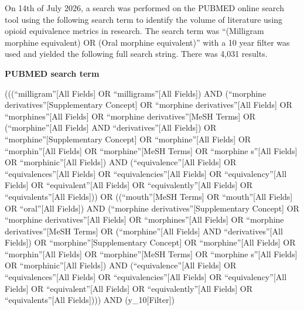 \documentclass[
  letterpaper,
  DIV=11,
  numbers=noendperiod]{scrreprt}
\begin{document}
{On 14th of July 2026, a search was performed on the PUBMED online search
tool using the following search term to identify the volume of
literature using opioid equivalence metrics in research. The search term
was ``(Milligram morphine equivalent) OR (Oral morphine equivalent)''
with a 10 year filter was used and yielded the following full search
string. There was 4,031 results.

\begin{tcolorbox}[enhanced jigsaw, rightrule=.15mm, toprule=.15mm, opacityback=0, breakable, bottomrule=.15mm, colback=white, leftrule=.75mm, arc=.35mm, left=2mm, colframe=quarto-callout-note-color-frame]
\begin{minipage}[t]{5.5mm}
\textcolor{quarto-callout-note-color}{\faInfo}
\end{minipage}%
\begin{minipage}[t]{\textwidth - 5.5mm}

\vspace{-3mm}\textbf{PUBMED search term}\vspace{3mm}

(((``milligram''{[}All Fields{]} OR ``milligrams''{[}All Fields{]}) AND
(``morphine derivatives''{[}Supplementary Concept{]} OR ``morphine
derivatives''{[}All Fields{]} OR ``morphines''{[}All Fields{]} OR
``morphine derivatives''{[}MeSH Terms{]} OR (``morphine''{[}All
Fields{]} AND ``derivatives''{[}All Fields{]}) OR
``morphine''{[}Supplementary Concept{]} OR ``morphine''{[}All Fields{]}
OR ``morphin''{[}All Fields{]} OR ``morphine''{[}MeSH Terms{]} OR
``morphine s''{[}All Fields{]} OR ``morphinic''{[}All Fields{]}) AND
(``equivalence''{[}All Fields{]} OR ``equivalences''{[}All Fields{]} OR
``equivalencies''{[}All Fields{]} OR ``equivalency''{[}All Fields{]} OR
``equivalent''{[}All Fields{]} OR ``equivalently''{[}All Fields{]} OR
``equivalents''{[}All Fields{]})) OR ((``mouth''{[}MeSH Terms{]} OR
``mouth''{[}All Fields{]} OR ``oral''{[}All Fields{]}) AND (``morphine
derivatives''{[}Supplementary Concept{]} OR ``morphine
derivatives''{[}All Fields{]} OR ``morphines''{[}All Fields{]} OR
``morphine derivatives''{[}MeSH Terms{]} OR (``morphine''{[}All
Fields{]} AND ``derivatives''{[}All Fields{]}) OR
``morphine''{[}Supplementary Concept{]} OR ``morphine''{[}All Fields{]}
OR ``morphin''{[}All Fields{]} OR ``morphine''{[}MeSH Terms{]} OR
``morphine s''{[}All Fields{]} OR ``morphinic''{[}All Fields{]}) AND
(``equivalence''{[}All Fields{]} OR ``equivalences''{[}All Fields{]} OR
``equivalencies''{[}All Fields{]} OR ``equivalency''{[}All Fields{]} OR
``equivalent''{[}All Fields{]} OR ``equivalently''{[}All Fields{]} OR
``equivalents''{[}All Fields{]}))) AND (y\_10{[}Filter{]})


\end{minipage}
\end{tcolorbox}}
\end{document}
